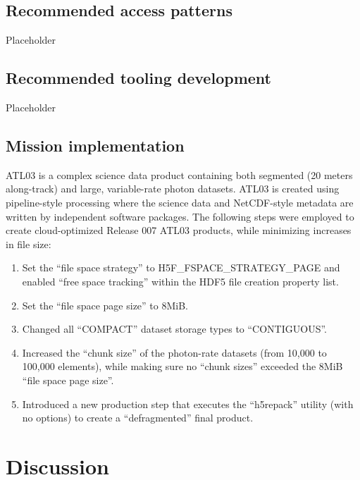 \documentclass[
]{agujournal2019}
\providecommand{\tightlist}{%
  \setlength{\itemsep}{0pt}\setlength{\parskip}{0pt}}\usepackage{longtable,booktabs,array}
\begin{document}
\subsection{Recommended access
patterns}\label{recommended-access-patterns}

Placeholder

\subsection{Recommended tooling
development}\label{recommended-tooling-development}

Placeholder

\subsection{Mission implementation}\label{mission-implementation}

ATL03 is a complex science data product containing both segmented (20
meters along-track) and large, variable-rate photon datasets. ATL03 is
created using pipeline-style processing where the science data and
NetCDF-style metadata are written by independent software packages. The
following steps were employed to create cloud-optimized Release 007
ATL03 products, while minimizing increases in file size:

\begin{enumerate}
\def\labelenumi{\arabic{enumi}.}
\tightlist
\item
  Set the ``file space strategy'' to H5F\_FSPACE\_STRATEGY\_PAGE and
  enabled ``free space tracking'' within the HDF5 file creation property
  list.
\item
  Set the ``file space page size'' to 8MiB.
\item
  Changed all ``COMPACT'' dataset storage types to ``CONTIGUOUS''.
\item
  Increased the ``chunk size'' of the photon-rate datasets (from 10,000
  to 100,000 elements), while making sure no ``chunk sizes'' exceeded
  the 8MiB ``file space page size''.
\item
  Introduced a new production step that executes the ``h5repack''
  utility (with no options) to create a ``defragmented'' final product.
\end{enumerate}

\section{Discussion}\label{discussion}
\end{document}
